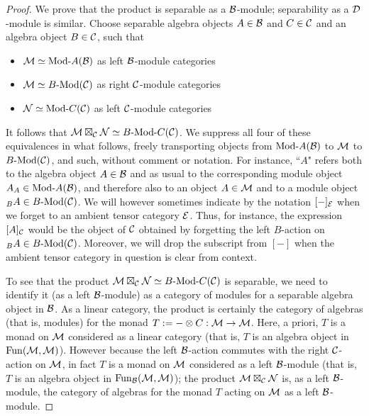 \documentclass{amsart}
\begin{document}
\begin{proof}
We prove that the product is separable as a $\mathcal B$-module; separability as a $\mathcal D$-module is similar.  Choose separable algebra objects $A \in \mathcal B$ and $C \in \mathcal C$ and an algebra object $B \in \mathcal C$, such that
\begin{itemize}
\item $\cM \simeq \Mod{}{A}(\cB)$ as left $\mathcal B$-module categories
\item $\cM \simeq \Mod{B}{}(\cC)$ as right $\mathcal C$-module categories
\item $\cN \simeq \Mod{}{C}(\cC)$ as left $\mathcal C$-module categories
\end{itemize}
It follows that $\cM \boxtimes_{\cC} \cN \simeq \Mod{B}{C}(\cC)$.  We suppress all four of these equivalences in what follows, freely transporting objects from $\Mod{}{A}(\cB)$ to $\mathcal M$ to $\Mod{B}{}(\cC)$, and such, without comment or notation.  For instance, ``$A$" refers both to the algebra object $A \in \mathcal B$ and as usual to the corresponding module object $A_A \in \Mod{}{A}(\cB)$, and therefore also to an object $A \in \mathcal M$ and to a module object ${}_B A \in \Mod{B}{}(\cC)$.  We will however sometimes indicate by the notation $[-]_\mathcal E$ when we forget to an ambient tensor category $\mathcal E$.  Thus, for instance, the expression $[A]_\mathcal C$ would be the object of $\mathcal C$ obtained by forgetting the left $B$-action on ${}_B A \in \Mod{B}{}(\cC)$.  Moreover, we will drop the subscript from $[-]$ when the ambient tensor category in question is clear from context.

To see that the product $\cM \boxtimes_\cC \cN \simeq \Mod{B}{C}(\cC)$ is separable, we need to identify it (as a left $\mathcal B$-module) as a category of modules for a separable algebra object in $\mathcal B$.  As a linear category, the product is certainly the category of algebras (that is, modules) for the monad $T := - \otimes C : \mathcal M \rightarrow \mathcal M$.  Here, a priori, $T$ is a monad on $\mathcal M$ considered as a linear category (that is, $T$ is an algebra object in $\operatorname{Fun}(\mathcal M,\mathcal M)$).  However because the left $\mathcal B$-action commutes with the right $\mathcal C$-action on $\mathcal M$, in fact $T$ is a monad on $\mathcal M$ considered as a left $\mathcal B$-module (that is, $T$ is an algebra object in $\operatorname{Fun}_\mathcal B(\mathcal M,\mathcal M)$); the product $\mathcal M \boxtimes_\mathcal C \mathcal N$ is, as a left $\mathcal B$-module, the category of algebras for the monad $T$ acting on $\mathcal M$ as a left $\mathcal B$-module.  


\end{proof}
\end{document}
